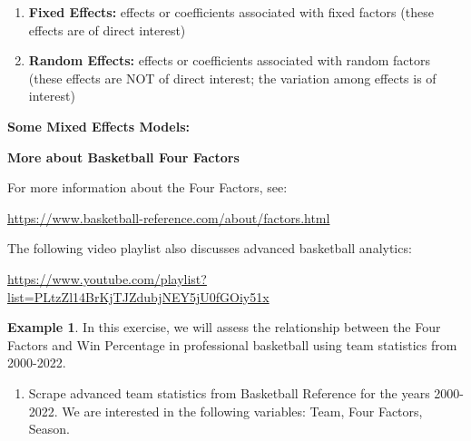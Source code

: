 \documentclass[
  11pt,
]{book}
\providecommand{\tightlist}{%
  \setlength{\itemsep}{0pt}\setlength{\parskip}{0pt}}
\theoremstyle{definition}
\theoremstyle{definition}
\newtheorem{example}{Example}[chapter]
\theoremstyle{definition}
\theoremstyle{definition}
\theoremstyle{remark}
\begin{document}
\begin{enumerate}
\def\labelenumi{(\roman{enumi})}
\item
  \textbf{Fixed Effects:} effects or coefficients associated with fixed factors (these effects are of
  direct interest)
\item
  \textbf{Random Effects:} effects or coefficients associated with random factors (these effects are
  NOT of direct interest; the variation among effects is of interest)
\end{enumerate}

\textbf{Some Mixed Effects Models:}\\

\vfill

\textbf{More about Basketball Four Factors}

For more information about the Four Factors, see:

\url{https://www.basketball-reference.com/about/factors.html}

The following video playlist also discusses advanced basketball analytics:

\url{https://www.youtube.com/playlist?list=PLtzZl14BrKjTJZdubjNEY5jU0fGOiy51x}

\newpage

\begin{example}
In this exercise, we will assess the relationship between the Four Factors and Win Percentage in professional basketball using team statistics from 2000-2022.
\end{example}

\begin{enumerate}
\def\labelenumi{(\alph{enumi})}
\tightlist
\item
  Scrape advanced team statistics from Basketball Reference for the years 2000-2022. We are interested in the following variables: Team, Four Factors, Season.
\end{enumerate}
\end{document}

